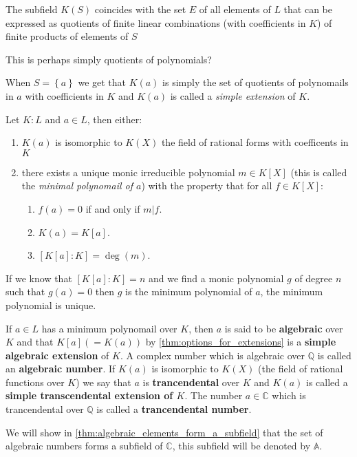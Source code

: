 \begin{theorem}
The subfield $K(S)$ coincides with the set $E$ of all elements of $L$ that can  be expressed as quotients of finite linear combinations (with coefficients in $K$) of finite products of elements of $S$
\end{theorem}
\begin{remark}
  This is perhaps simply quotients of polynomials?
\end{remark}
When $S = \left\{a\right\}$ we get that $K(a)$ is simply the set of quotients of polynomails in $a$ with coefficients in $K$ and $K(a)$ is called a \textit{simple extension} of $K$.
\begin{theorem}\label{thm:options_for_extensions}
  Let $K : L$  and $a \in L$, then either:
  \begin{enumerate}
     \item $K(a)$ is isomorphic to $K(X)$ the field of rational forms with coefficents in $K$
    \item there exists a unique monic irreducible polynomial $m \in K[X]$  (this is called the \textit{minimal polynomail of $a$}) with the property that for all $f \in K[X]$:
          \begin{enumerate}
\item $f(a) = 0$ if and only if $m | f$.
            \item $K(a) = K[a]$.
                  \item $[K[a]:K] = \deg(m)$.
          \end{enumerate}
  \end{enumerate}
\end{theorem}

\begin{remark}
  If we know that $[K[a] : K] = n$  and we find a monic polynomial $g$ of degree $n$ such that $g(a) = 0$ then $g$ is the minimum polynomial of $a$, the minimum polynomial is unique.
\end{remark}

\begin{definition}
  If $a \in L$ has  a minimum polynomail over $K$, then $a$ is said to be \textbf{algebraic} over $K$ and that $K[a] (=K(a))$ by \autoref{thm:options_for_extensions} is a \textbf{simple algebraic extension} of $K$. A complex number which is algebraic over $\mathbb{Q}$ is called an \textbf{algebraic number}.
  If $K(a)$ is isomorphic to $K(X)$ (the field of rational functions over $K$) we say that $a$ is \textbf{trancendental} over $K$ and $K(a)$ is called a \textbf{simple transcendental extension of $K$}. The number $a \in \mathbb{C}$ which is trancendental over $\mathbb{Q}$ is called a \textbf{trancendental number}.
\end{definition}
We will show in \autoref{thm:algebraic_elements_form_a_subfield} that the set of algebraic numbers forms a subfield of $\mathbb{C}$, this subfield will be denoted by $\mathbb{A}$.

